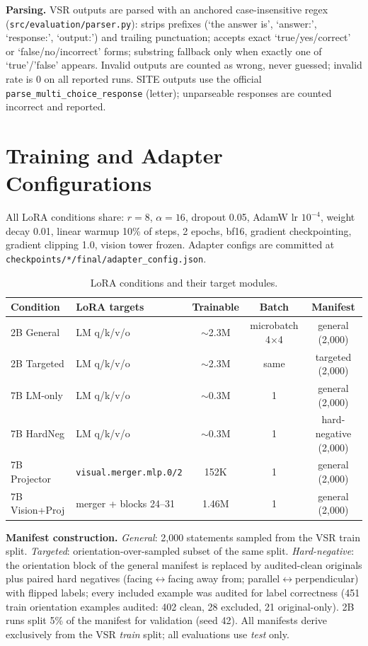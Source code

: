 \textbf{Parsing.} VSR outputs are parsed with an anchored case-insensitive
regex (\texttt{src/evaluation/parser.py}): strips prefixes
(`the answer is', `answer:', `response:', `output:') and trailing
punctuation; accepts exact `true/yes/correct' or `false/no/incorrect' forms;
substring fallback only when exactly one of `true'/'false' appears. Invalid
outputs are counted as wrong, never guessed; invalid rate is 0 on all reported
runs. SITE outputs use the official \texttt{parse\_multi\_choice\_response}
(letter); unparseable responses are counted incorrect and reported.

\section{Training and Adapter Configurations}
\label{app:training}

All LoRA conditions share: $r{=}8$, $\alpha{=}16$, dropout 0.05, AdamW
lr $10^{-4}$, weight decay 0.01, linear warmup 10\% of steps, 2 epochs,
bf16, gradient checkpointing, gradient clipping 1.0, vision tower frozen.
Adapter configs are committed at \texttt{checkpoints/*/final/adapter\_config.json}.

\begin{table}[h]
\centering
\footnotesize
\setlength{\tabcolsep}{4pt}
\begin{tabular}{llccc}
\toprule
Condition & LoRA targets & Trainable & Batch & Manifest \\
\midrule
2B General & LM q/k/v/o & $\sim$2.3M & microbatch 4$\times$4 & general (2{,}000) \\
2B Targeted & LM q/k/v/o & $\sim$2.3M & same & targeted (2{,}000) \\
7B LM-only & LM q/k/v/o & $\sim$0.3M & 1 & general (2{,}000) \\
7B HardNeg & LM q/k/v/o & $\sim$0.3M & 1 & hard-negative (2{,}000) \\
7B Projector & \texttt{visual.merger.mlp.0/2} & 152K & 1 & general (2{,}000) \\
7B Vision+Proj & merger + blocks 24--31 & 1.46M & 1 & general (2{,}000) \\
\bottomrule
\end{tabular}
\caption{LoRA conditions and their target modules.}
\label{tab:adapters}
\end{table}

\textbf{Manifest construction.} \emph{General}: 2{,}000 statements sampled from
the VSR train split. \emph{Targeted}: orientation-over-sampled subset of the
same split. \emph{Hard-negative}: the orientation block of the general manifest
is replaced by audited-clean originals plus paired hard negatives
(facing$\leftrightarrow$facing away from; parallel$\leftrightarrow$perpendicular)
with flipped labels; every included example was audited for label correctness
(451 train orientation examples audited: 402 clean, 28 excluded, 21 original-only). 2B runs split
5\% of the manifest for validation (seed 42). All manifests derive exclusively
from the VSR \emph{train} split; all evaluations use \emph{test} only.

